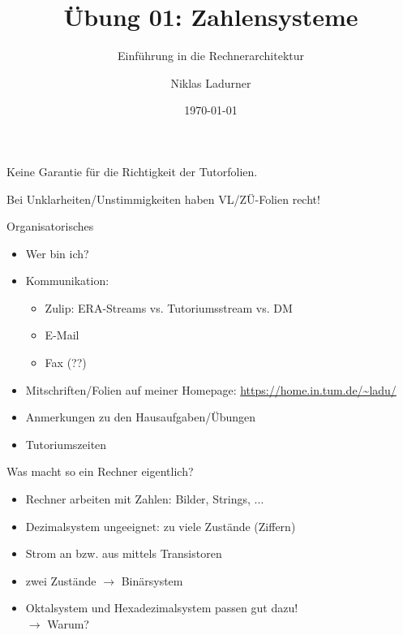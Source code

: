 \documentclass[
  german,            %
  aspectratio=169,    %
]{tumbeamer}
\title{Übung 01: Zahlensysteme}
\subtitle{Einführung in die Rechnerarchitektur}
\author{Niklas Ladurner}
\institute{\theChairName\\\theDepartmentName\\\theUniversityName}
\date[\today]{\today}
\begin{document}
\maketitle

\begin{frame}[c]{}{}
  \begin{center}
    \LARGE  Keine Garantie für die Richtigkeit der Tutorfolien.

    \Large Bei Unklarheiten/Unstimmigkeiten haben VL/ZÜ-Folien recht!
  \end{center}
\end{frame}

\begin{frame}[c]{Organisatorisches}{}
  \begin{itemize}
    \item Wer bin ich?
    \item Kommunikation:
          \begin{itemize}
            \item Zulip: ERA-Streams vs. Tutoriumsstream vs. DM
            \item E-Mail
            \item Fax (??)
          \end{itemize}
    \item Mitschriften/Folien auf meiner Homepage: \url{https://home.in.tum.de/~ladu/}
    \item Anmerkungen zu den Hausaufgaben/Übungen
    \item Tutoriumszeiten
  \end{itemize}
\end{frame}

\begin{frame}[c]{Was macht so ein Rechner eigentlich?}{}
  \begin{itemize}
    \item Rechner arbeiten mit Zahlen: Bilder, Strings, ...
    \item Dezimalsystem ungeeignet: zu viele Zustände (Ziffern)
    \item Strom an bzw. aus mittels Transistoren
    \item zwei Zustände $\rightarrow$ Binärsystem
    \item Oktalsystem und Hexadezimalsystem passen gut dazu! \\ $\rightarrow$ Warum?
  \end{itemize}
\end{frame}
\end{document}
